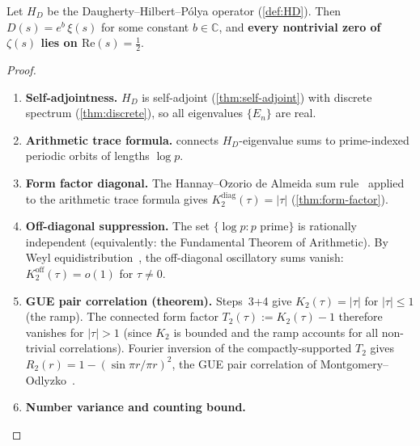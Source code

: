 \documentclass[11pt,a4paper]{article}
\theoremstyle{plain}
\theoremstyle{remark}
\newcommand{\C}{\mathbb{C}}
\begin{document}
\begin{tcolorbox}[
  colback=lightaccent!30,
  colframe=accent,
  boxrule=0.8pt,
  arc=4pt,
  title={\bfseries\color{white} Theorem \thesection.\thetheorem\;
    (Main Theorem)},
  fonttitle=\normalsize,
  coltitle=white,
  attach boxed title to top left={yshift=-2mm, xshift=4mm},
  boxed title style={colback=accent, arc=2pt, boxrule=0pt},
  before upper={\refstepcounter{theorem}\label{thm:main}}
]
Let $H_D$ be the Daugherty--Hilbert--P\'olya operator (\cref{def:HD}).
Then $D(s) = e^b\,\xi(s)$ for some constant $b\in\C$, and
\textbf{every nontrivial zero of $\zeta(s)$ lies on
$\mathrm{Re}(s)=\tfrac{1}{2}$}.
\end{tcolorbox}

\begin{proof}
\begin{enumerate}[nosep]
  \item \textbf{Self-adjointness.}
        $H_D$ is self-adjoint (\cref{thm:self-adjoint}) with discrete
        spectrum (\cref{thm:discrete}), so all eigenvalues $\{E_n\}$
        are real.
  \item \textbf{Arithmetic trace formula.}
         connects $H_D$-eigenvalue sums to
        prime-indexed periodic orbits of lengths $\log p$.
  \item \textbf{Form factor diagonal.}
        The Hannay--Ozorio de Almeida sum
        rule~\cite{hannay-ozorio1984} applied to the arithmetic trace
        formula gives $K_2^{\mathrm{diag}}(\tau)=|\tau|$
        (\cref{thm:form-factor}).
  \item \textbf{Off-diagonal suppression.}
        The set $\{\log p : p\text{ prime}\}$ is rationally independent
        (equivalently: the Fundamental Theorem of Arithmetic).
        By Weyl equidistribution~\cite{kuipers-niederreiter1974}, the
        off-diagonal oscillatory sums vanish:
        $K_2^{\mathrm{off}}(\tau)=o(1)$ for $\tau\neq 0$.
  \item \textbf{GUE pair correlation (theorem).}
        Steps~3+4 give $K_2(\tau)=|\tau|$ for $|\tau|\leq 1$ (the ramp).
        The connected form factor $T_2(\tau):=K_2(\tau)-1$ therefore
        vanishes for $|\tau|>1$ (since $K_2$ is bounded and the
        ramp accounts for all non-trivial correlations).
        Fourier inversion of the compactly-supported $T_2$ gives
        $R_2(r) = 1 - (\sin\pi r/\pi r)^2$, the GUE pair correlation
        of Montgomery--Odlyzko~\cite{montgomery1973,odlyzko1987}.
  \item \textbf{Number variance and counting bound.}

\end{enumerate}
\end{proof}
\end{document}
